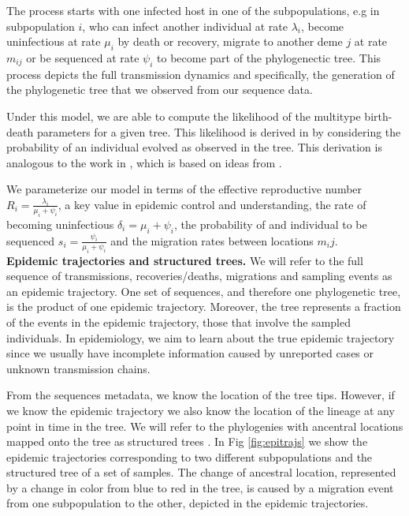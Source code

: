 The process starts with one infected host in one of the subpopulations, e.g in subpopulation $i$, who can infect another individual at rate $\lambda_i$, become uninfectious at rate $\mu_i$ by death or recovery, migrate to another deme $j$ at rate $m_{ij}$ or be sequenced at rate $\psi_i$ to become part of the phylogenectic tree. This process depicts the full transmission dynamics and specifically, the generation of the phylogenetic tree that we observed from our sequence data. 

Under this model, we are able to compute the likelihood of the multitype birth-death parameters for a given tree. This likelihood is derived in \cite{Kuhnert2016} by considering the probability of an individual evolved as observed in the tree. This derivation is analogous to the work in \cite{Stadler2013}, which is based on ideas from \cite{Maddison2007}.

We parameterize our model in terms of the effective reproductive number $R_i = \frac{\lambda_i}{\mu_i + \psi_i}$, a key value in epidemic control and understanding, the rate of becoming uninfectious $\delta_i = \mu_i + \psi_i$, the probability of and individual to be sequenced $s_i = \frac{\psi_i}{\mu_i + \psi_i}$ and the migration rates between locations $m_ij$.\\

\textbf{Epidemic trajectories and structured trees.} 
We will refer to the full sequence of transmissions, recoveries/deaths, migrations and sampling events as an epidemic trajectory. One set of sequences, and therefore one phylogenetic tree, is the product of one epidemic trajectory. Moreover, the tree represents a fraction of the events in the epidemic trajectory, those that involve the sampled individuals. In epidemiology, we aim to learn about the true epidemic trajectory since we usually have incomplete information caused by unreported cases or unknown transmission chains.

From the sequences metadata, we know the location of the tree tips. However, if we know the epidemic trajectory we also know the location of the lineage at any point in time in the tree. We will refer to the phylogenies with ancentral locations mapped onto the tree as structured trees \cite{Vaughan2014}. In Fig \ref{fig:epitrajs} we show the epidemic trajectories corresponding to two different subpopulations and the structured tree of a set of samples. The change of ancestral location, represented by a change in color from blue to red in the tree, is caused by a migration event from one subpopulation to the other, depicted in the epidemic trajectories.

